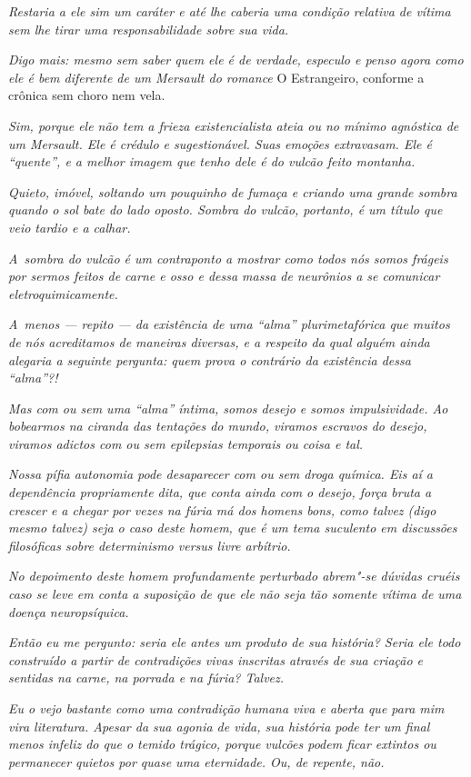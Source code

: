 \emph{Restaria a ele sim um caráter e até lhe caberia uma condição
relativa de vítima sem lhe tirar uma responsabilidade sobre sua vida.}~

\emph{Digo mais: mesmo sem saber quem ele é de verdade, especulo e penso
agora como ele é bem diferente de um Mersault do romance} O Estrangeiro,
{conforme a crônica sem choro nem vela.}~

\emph{Sim, porque ele não tem a frieza existencialista ateia ou no
mínimo agnóstica de um Mersault. Ele é crédulo e sugestionável. Suas
emoções extravasam. Ele é ``quente'', e a melhor imagem que tenho dele é
do vulcão feito montanha.}~

\emph{Quieto, imóvel, soltando um pouquinho de fumaça e criando uma
grande sombra quando o sol bate do lado oposto. Sombra do vulcão,
portanto, é um título que veio tardio e a calhar.}~

\emph{A~sombra do vulcão é um contraponto a mostrar como todos nós somos
frágeis por sermos feitos de carne e osso e dessa massa de neurônios a
se comunicar eletroquimicamente.}~

\emph{A~menos --- repito --- da existência de uma ``alma''
plurimetafórica que muitos de nós acreditamos de maneiras diversas, e a
respeito da qual alguém ainda alegaria a seguinte pergunta: quem prova o
contrário da existência dessa ``alma''?!}~

\emph{Mas com ou sem uma ``alma'' íntima, somos desejo e somos
impulsividade. Ao bobearmos na ciranda das tentações do mundo, viramos
escravos do desejo, viramos adictos com ou sem epilepsias temporais ou
coisa e tal.}~

\emph{Nossa pífia autonomia pode desaparecer com ou sem droga química.
Eis aí a dependência propriamente dita, que conta ainda com o desejo,
força bruta a crescer e a chegar por vezes na fúria má dos homens bons,
como talvez (digo mesmo talvez) seja o caso deste homem, que é um tema
suculento em discussões filosóficas sobre determinismo versus livre
arbítrio.}~

\emph{No depoimento deste homem profundamente perturbado abrem"-se
dúvidas cruéis caso se leve em conta a suposição de que ele não seja tão
somente vítima de uma doença neuropsíquica.}~

\emph{Então eu me pergunto: seria ele antes um produto de sua história?
Seria ele todo construído a partir de contradições vivas inscritas
através de sua criação e sentidas na carne, na porrada e na fúria?
Talvez.}~

\emph{Eu o vejo bastante como uma contradição humana viva e aberta que
para mim vira literatura. Apesar da sua agonia de vida, sua história
pode ter um final menos infeliz do que o temido trágico, porque vulcões
podem ficar extintos ou permanecer quietos por quase uma eternidade. Ou,
de repente, não.}
